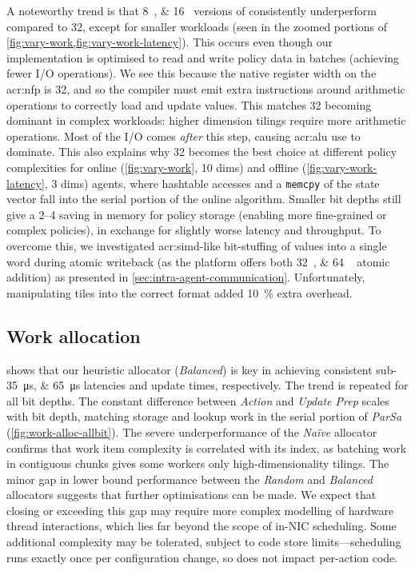 A noteworthy trend is that \qtylist{8;16}{\bit} versions of \approachshort{} consistently underperform compared to \qty{32}{\bit}, except for smaller workloads (seen in the zoomed portions of \cref{fig:vary-work,fig:vary-work-latency}).
This occurs even though our implementation is optimised to read and write policy data in batches (achieving fewer I/O operations).
We see this because the native register width on the \gls{acr:nfp} is \qty{32}{\bit}, and so the compiler must emit extra instructions around arithmetic operations to correctly load and update values.
This matches \qty{32}{\bit} becoming dominant in complex workloads: higher dimension tilings require more arithmetic operations.
Most of the I/O comes \emph{after} this step, causing \gls{acr:alu} use to dominate.
This also explains why \qty{32}{\bit} becomes the best choice at different policy complexities for online (\cref{fig:vary-work}, 10 dims) and offline (\cref{fig:vary-work-latency}, 3 dims) agents, where hashtable accesses and a \texttt{memcpy} of the state vector fall into the serial portion of the online algorithm.
Smaller bit depths still give a \qtyrange{2}{4}{\times} saving in memory for policy storage (enabling more fine-grained or complex policies), in exchange for slightly worse latency and throughput.
To overcome this, we investigated \gls{acr:simd}-like bit-stuffing of values into a single word during atomic writeback (as the platform offers both \qtylist{32;64
}{\bit} atomic addition) as presented in \cref{sec:intra-agent-communication}.
Unfortunately, manipulating tiles into the correct format added \qty{10}{\percent} extra overhead.

\subsection{Work allocation}\label{sec:opal-results-work-alloc}
 shows that our heuristic allocator (\emph{Balanced}) is key in achieving consistent sub-\qtylist{35;65}{\micro\second} latencies and update times, respectively.
The trend is repeated for all bit depths.
The constant difference between \emph{Action} and \emph{Update Prep} scales with bit depth, matching storage and lookup work in the serial portion of \emph{ParSa} (\cref{fig:work-alloc-allbit}).
The severe underperformance of the \emph{Na\"{i}ve} allocator confirms that work item complexity is correlated with its index, as batching work in contiguous chunks gives some workers only high-dimensionality tilings.
The minor gap in lower bound performance between the \emph{Random} and \emph{Balanced} allocators suggests that further optimisations can be made.
We expect that closing or exceeding this gap may require more complex modelling of hardware thread interactions, which lies far beyond the scope of in-NIC scheduling.
Some additional complexity may be tolerated, subject to code store limits---scheduling runs exactly once per configuration change, so does not impact per-action code.

